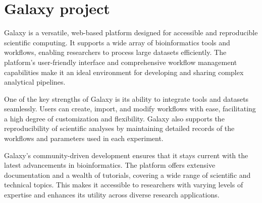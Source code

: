 \newpage
\section{Galaxy project}\label{sec:Galaxy-intro}
Galaxy is a versatile, web-based platform designed for accessible and reproducible scientific computing. 
It supports a wide array of bioinformatics tools and workflows, enabling researchers to process large datasets efficiently. 
The platform's user-friendly interface and comprehensive workflow management capabilities make it an ideal environment for developing and sharing complex analytical pipelines.

One of the key strengths of Galaxy is its ability to integrate tools and datasets seamlessly. 
Users can create, import, and modify workflows with ease, facilitating a high degree of customization and flexibility.
Galaxy also supports the reproducibility of scientific analyses by maintaining detailed records of the workflows and parameters used in each experiment.

Galaxy's community-driven development ensures that it stays current with the latest advancements in bioinformatics. 
The platform offers extensive documentation and a wealth of tutorials, covering a wide range of scientific and technical topics.
This makes it accessible to researchers with varying levels of expertise and enhances its utility across diverse research applications.